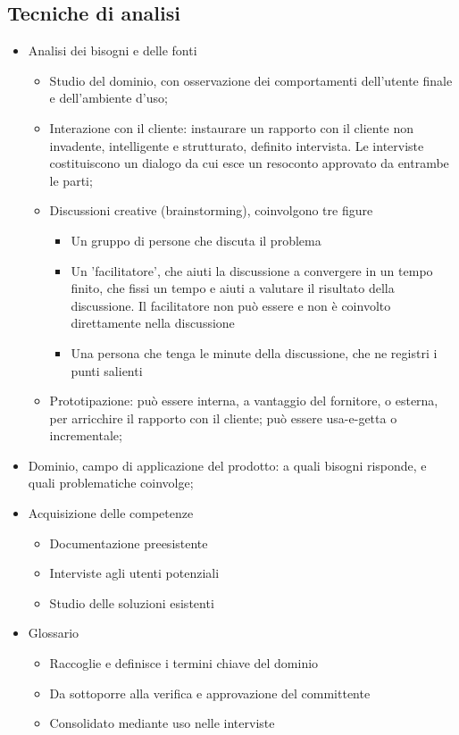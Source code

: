\subsection{Tecniche di analisi}
\begin{itemize}
	\item Analisi dei bisogni e delle fonti
		\begin{itemize}
			\item Studio del dominio, con osservazione dei comportamenti dell'utente finale e dell'ambiente d'uso;
			\item Interazione con il cliente: instaurare un rapporto con il cliente non invadente, intelligente e strutturato, definito intervista. Le interviste costituiscono un dialogo da cui esce un resoconto approvato da entrambe le parti;
			\item Discussioni creative (brainstorming), coinvolgono tre figure
				\begin{itemize}
					\item Un gruppo di persone che discuta il problema
					\item Un 'facilitatore', che aiuti la discussione a convergere in un tempo finito, che fissi un tempo e aiuti a valutare il risultato della discussione. Il facilitatore non può essere  e non è coinvolto direttamente nella discussione
					\item Una persona che tenga le minute della discussione, che ne registri i punti salienti
				\end{itemize}
			\item Prototipazione: può essere interna, a vantaggio del fornitore, o esterna, per arricchire il rapporto con il cliente; può essere usa-e-getta o incrementale;
		\end{itemize}
	\item Dominio, campo di applicazione del prodotto: a quali bisogni risponde, e quali problematiche coinvolge;
	\item Acquisizione delle competenze
		\begin{itemize}
			\item Documentazione preesistente
			\item Interviste agli utenti potenziali
			\item Studio delle soluzioni esistenti
		\end{itemize}
	\item Glossario
		\begin{itemize}
			\item Raccoglie e definisce i termini chiave del dominio
			\item Da sottoporre alla verifica e approvazione del committente
			\item Consolidato mediante uso nelle interviste
		\end{itemize}
\end{itemize}